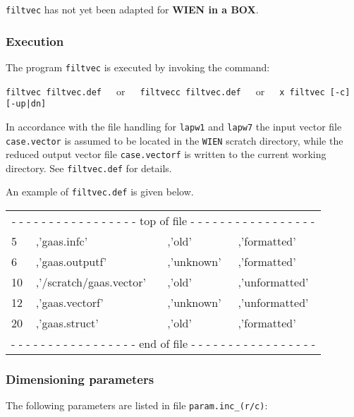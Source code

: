 \documentclass[10pt,fleqn,a4paper,twosided]{article}
\begin{document}
{\tt filtvec} has not yet been adapted for {\bf WIEN in a BOX}.


\subsubsection{Execution}

The program {\tt filtvec} is executed by invoking the command:

\vspace*{.25cm}
\hspace*{1.cm}
{\tt filtvec filtvec.def}\ \ \ or\ \ \ {\tt filtvecc filtvec.def}\ \ \ or\ \ \ 
{\tt x filtvec [-c] [-up|dn]}

\vspace*{.25cm}
In accordance with the file handling for {\tt lapw1} and {\tt lapw7} the input 
vector file {\tt case.vector} is assumed to be located in the {\tt WIEN}
scratch directory, while the reduced output vector file {\tt case.vectorf} is
written to the current working directory. See {\tt filtvec.def} for details.

\vspace*{0.25cm}
An example of {\tt filtvec.def} is given below.

\vspace*{.25cm}
{\tt \begin{tabular}{llll}
\multicolumn{4}{c}{
- - - - - - - - - - - - - - - - - top of file - - - - - - - - - - - - - - - - -}\\[-.0ex]
5  & ,'gaas.infc'    & ,'old'     & ,'formatted'   \\[-.0ex]
6  & ,'gaas.outputf' & ,'unknown' & ,'formatted'   \\[-.0ex]
10 & ,'/scratch/gaas.vector'  & ,'old'     & ,'unformatted' \\[-.0ex]
12 & ,'gaas.vectorf' & ,'unknown' & ,'unformatted' \\[-.0ex]
20 & ,'gaas.struct'  & ,'old'     & ,'formatted'   \\[-.0ex]
\multicolumn{4}{c}{
- - - - - - - - - - - - - - - - - end of file - - - - - - - - - - - - - - - - -}\\
\end{tabular}}
\vspace*{.25cm}


\subsubsection{Dimensioning parameters}

The following parameters are listed in file {\tt param.inc\_(r/c)}:
\end{document}
